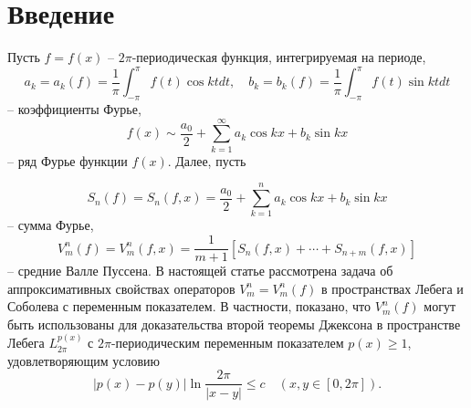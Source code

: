 \section{ Введение}\label{s1}

Пусть $f=f(x)$ -- $2\pi$-периодическая функция, интегрируемая на периоде,
\begin{equation}\label{1.1}
    a_k=a_k(f)=\frac1\pi\int_{-\pi}^\pi f(t)\cos ktdt,\quad b_k=b_k(f)=\frac1\pi\int_{-\pi}^\pi f(t)\sin ktdt
\end{equation}
-- коэффициенты Фурье,
\begin{equation}\label{1.2}
    f(x) \sim \frac{a_0}{2}+ \sum_{k=1}^\infty a_k\cos kx+b_k\sin kx
\end{equation}
-- ряд Фурье функции $f(x)$. Далее, пусть

\begin{equation} \label{1.3}
 S_n(f)=   S_n(f,x)=\frac{a_0}{2}+ \sum_{k=1}^n a_k\cos kx+b_k\sin kx
\end{equation}
-- сумма Фурье,
\begin{equation}\label{1.4}
 V_m^n(f)=V_m^n(f,x)=\frac1{m+1}[S_n(f,x)+\cdots+S_{n+m}(f,x)]
\end{equation}
-- средние Валле Пуссена. В настоящей статье рассмотрена задача
об аппроксимативных свойствах операторов $V_m^n=V_m^n(f)$ в пространствах Лебега и Соболева с переменным показателем.
В частности, показано, что $V_m^n(f)$ могут быть использованы для доказательства второй теоремы Джексона в пространстве
Лебега $L_{2\pi}^{p(x)}$ с $2\pi$-периодическим переменным показателем  $p(x)\ge1$, удовлетворяющим условию
\begin{equation}\label{1.5}
  |p(x)-p(y)|\ln\frac{2\pi}{|x-y|}\le c \quad (x,y\in [0,2\pi]).
  \end{equation}

